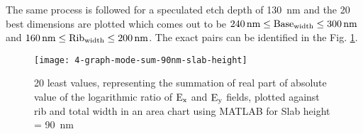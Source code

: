 \documentclass[../report.tex]{subfiles}
\begin{document}
The same process is followed for a speculated etch depth of \SI{130}{\nano \meter} and the 20 best dimensions are plotted which comes out to be $\mathrm{\SI{240}{\nano \meter} \leq Base_{width} \leq \SI{300}{\nano \meter}}$ and $\mathrm{\SI{160}{\nano \meter} \leq Rib_{width} \leq \SI{200}{\nano \meter}}$. The exact pairs can be identified in the Fig. \ref{fig:4_graph_mode_sum_90nm_slab_height}.
\begin{figure}[H] %
	\centering
	\texttt{[image: 4-graph-mode-sum-90nm-slab-height]}
	\caption{20 least values, representing the summation of real part of absolute value of the logarithmic ratio of $\mathrm{E_x}$ and $\mathrm{E_y}$ fields, plotted against rib and total width in an area chart using MATLAB for Slab height = \SI{90}{\nano \meter}}
	\label{fig:4_graph_mode_sum_90nm_slab_height}
\end{figure}
\end{document}
